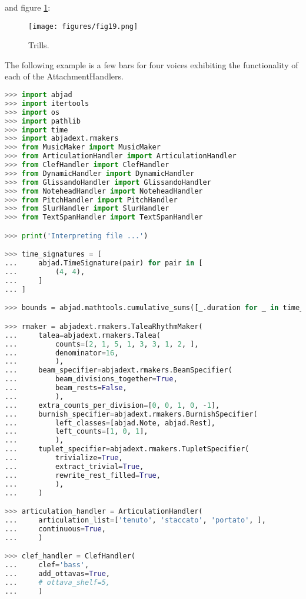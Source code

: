 and figure \ref{fig:trills}:

\singlespace
\begin{figure}[h]
  \texttt{[image: figures/fig19.png]}
  \caption{Trills.}
  \label{fig:trills}
\end{figure}
\doublespace

The following example is a few bars for four voices exhibiting the functionality of each of the AttachmentHandlers.

\singlespace
\begin{lstlisting}[language=Python, caption=Demonstration of AttachmentHandlers]
>>> import abjad
>>> import itertools
>>> import os
>>> import pathlib
>>> import time
>>> import abjadext.rmakers
>>> from MusicMaker import MusicMaker
>>> from ArticulationHandler import ArticulationHandler
>>> from ClefHandler import ClefHandler
>>> from DynamicHandler import DynamicHandler
>>> from GlissandoHandler import GlissandoHandler
>>> from NoteheadHandler import NoteheadHandler
>>> from PitchHandler import PitchHandler
>>> from SlurHandler import SlurHandler
>>> from TextSpanHandler import TextSpanHandler

>>> print('Interpreting file ...')

>>> time_signatures = [
...     abjad.TimeSignature(pair) for pair in [
...         (4, 4),
...     ]
... ]

>>> bounds = abjad.mathtools.cumulative_sums([_.duration for _ in time_signatures])

>>> rmaker = abjadext.rmakers.TaleaRhythmMaker(
...     talea=abjadext.rmakers.Talea(
...         counts=[2, 1, 5, 1, 3, 3, 1, 2, ],
...         denominator=16,
...         ),
...     beam_specifier=abjadext.rmakers.BeamSpecifier(
...         beam_divisions_together=True,
...         beam_rests=False,
...         ),
...     extra_counts_per_division=[0, 0, 1, 0, -1],
...     burnish_specifier=abjadext.rmakers.BurnishSpecifier(
...         left_classes=[abjad.Note, abjad.Rest],
...         left_counts=[1, 0, 1],
...         ),
...     tuplet_specifier=abjadext.rmakers.TupletSpecifier(
...         trivialize=True,
...         extract_trivial=True,
...         rewrite_rest_filled=True,
...         ),
...     )

>>> articulation_handler = ArticulationHandler(
...     articulation_list=['tenuto', 'staccato', 'portato', ],
...     continuous=True,
...     )

>>> clef_handler = ClefHandler(
...     clef='bass',
...     add_ottavas=True,
...     # ottava_shelf=5,
...     )


\end{lstlisting}
